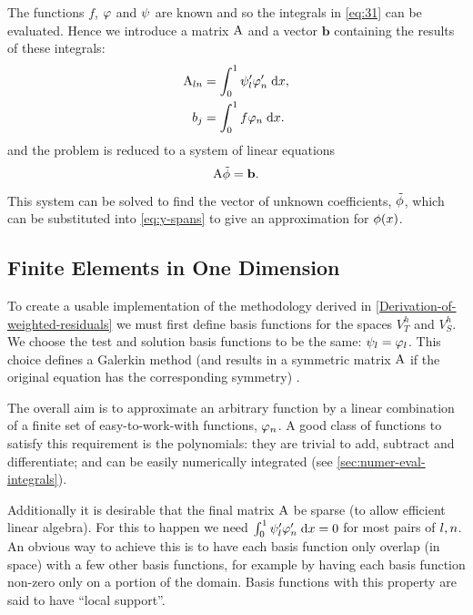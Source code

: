 The functions $f$, $\varphi$ and $\psi$ are known and so the integrals in \cref{eq:31} can be evaluated.
Hence we introduce a matrix $\mathrm{A}$ and a vector $\mathbf{b}$ containing the results of these integrals:
\begin{equation}
  \begin{aligned}
    \mathrm{A}_{ln} &= {\int_0^1  \psi_{l}'\varphi'_{n}  {\; \mathrm{{d}}}{x}}, \\
    b_{j} &= {\int_0^1  f\varphi_{n}  {\; \mathrm{{d}}}{x}}. \\
    \label{eq:Aij_bj}
  \end{aligned}
\end{equation}
and the problem is reduced to a system of linear equations
\begin{equation}
  \mathrm{A} \tilde{\phi} = {\mathbf{b}}.
  \label{eq:final_galerkin}
\end{equation}
This system can be solved to find the vector of unknown coefficients, $\tilde{\phi}$, which can be substituted into \cref{eq:y-spans} to give an approximation for $\phi(x)$.


\subsection{Finite Elements in One Dimension}
\label{sub:Actual-Finite-Elements}

To create a usable implementation of the methodology derived in \cref{Derivation-of-weighted-residuals} we must first define basis functions for the spaces $V_{T}^{h}$ and $V_S^h$.
We choose the test and solution basis functions to be the same: $\psi_l = \varphi_l$.
This choice defines a Galerkin method (and results in a symmetric matrix $\mathrm{A}$ if the original equation has the corresponding symmetry) \cite[215]{Zeinkiewicz1967}.

The overall aim is to approximate an arbitrary function by a linear combination of a finite set of easy-to-work-with functions, $\varphi_n$.
A good class of functions to satisfy this requirement is the polynomials: they are trivial to add, subtract and differentiate; and can be easily numerically integrated (see \cref{sec:numer-eval-integrals}).

Additionally it is desirable that the final matrix $\mathrm{A}$ be sparse (to allow efficient linear algebra).
For this to happen we need ${\int_0^1  \psi_{l}'\varphi'_{n}  {\; \mathrm{{d}}}{x}} = 0$ for most pairs of $l, n$. 
An obvious way to achieve this is to have each basis function only overlap (in space) with a few other basis functions, for example by having each basis function non-zero only on a portion of the domain.
Basis functions with this property are said to have ``local support''.

